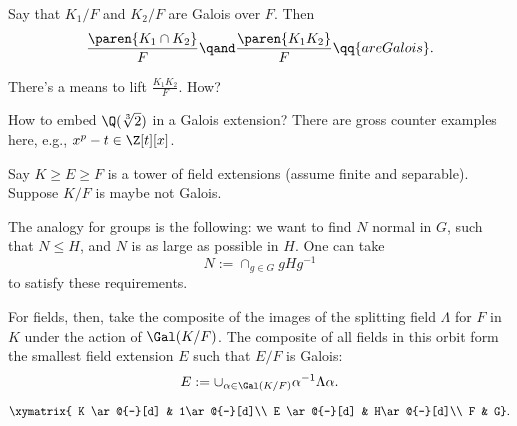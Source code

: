 \begin{prop}
    Say that $K_1/F$ and $K_2/F$ are Galois over $F$. Then 
    \[
        \frac{\paren{ K_1 \cap K_2 }}{F} \qand  \frac{\paren{ K_1 K_2 }}{F} \qq{are Galois}
    .\]
\end{prop}

\begin{coro}
   There's a means to lift $\frac{K_1 K_2}{F}$. How?
\end{coro}

How to embed $\Q(\sqrt[3]{2})$ in a Galois extension?
There are gross counter examples here, e.g., $x^p - t \in \Z[t][x]$.

\begin{defn}

    Say $K \ge E \ge F$ is a tower of field extensions (assume finite and separable). Suppose $K/F$ is maybe not Galois. 

    The analogy for groups is the following: we want to find $N$ normal in $G$, such that $N \le H$, and $N$ is as large as possible in $H$. One can take 
    \[
        N := \cap_{g \in G} gHg^{-1}
    \]
   to satisfy these requirements.  

   For fields, then, take the composite of the images of the splitting field $\Lambda$ for $F$ in $K$ under the action of $\Gal(K/F)$. The composite of all fields in this orbit form the smallest field extension $E$ such that $E/F$ is Galois:
    \[
        E := \cup_{\alpha \in \Gal(K/F)} \alpha^{-1} \Lambda \alpha
    .\]

\[
    \xymatrix{
        K \ar@{-}[d] & 1\ar@{-}[d]\\
        E \ar@{-}[d] & H\ar@{-}[d]\\
        F & G}
.\]
    
\end{defn}
